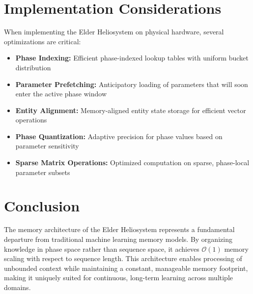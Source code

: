 \section{Implementation Considerations}

When implementing the Elder Heliosystem on physical hardware, several optimizations are critical:

\begin{itemize}
    \item \textbf{Phase Indexing:} Efficient phase-indexed lookup tables with uniform bucket distribution
    \item \textbf{Parameter Prefetching:} Anticipatory loading of parameters that will soon enter the active phase window
    \item \textbf{Entity Alignment:} Memory-aligned entity state storage for efficient vector operations
    \item \textbf{Phase Quantization:} Adaptive precision for phase values based on parameter sensitivity
    \item \textbf{Sparse Matrix Operations:} Optimized computation on sparse, phase-local parameter subsets
\end{itemize}

\section{Conclusion}

The memory architecture of the Elder Heliosystem represents a fundamental departure from traditional machine learning memory models. By organizing knowledge in phase space rather than sequence space, it achieves $\mathcal{O}(1)$ memory scaling with respect to sequence length. This architecture enables processing of unbounded context while maintaining a constant, manageable memory footprint, making it uniquely suited for continuous, long-term learning across multiple domains.